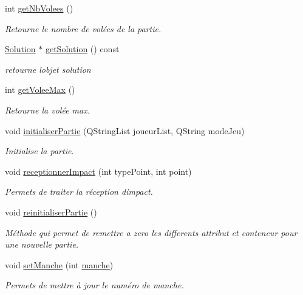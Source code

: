 \begin{DoxyCompactItemize}
int \hyperlink{class_darts_a4b93d786fbd25b9512ad08b67bca0a69}{get\+Nb\+Volees} ()
\begin{DoxyCompactList}\small\item\em Retourne le nombre de volées de la partie. \end{DoxyCompactList}\item 
\hyperlink{class_solution}{Solution} $\ast$ \hyperlink{class_darts_a2e41c247a12dfd3065c77c2484fc5532}{get\+Solution} () const
\begin{DoxyCompactList}\small\item\em retourne l\textquotesingle{}objet solution \end{DoxyCompactList}\item 
int \hyperlink{class_darts_af2ca14bafbcdabe87fc306cc2e1d390e}{get\+Volee\+Max} ()
\begin{DoxyCompactList}\small\item\em Retourne la volée max. \end{DoxyCompactList}\item 
void \hyperlink{class_darts_ac7000897b8d394c3be39804813a39dc8}{initialiser\+Partie} (Q\+String\+List joueur\+List, Q\+String mode\+Jeu)
\begin{DoxyCompactList}\small\item\em Initialise la partie. \end{DoxyCompactList}\item 
void \hyperlink{class_darts_a196bc4307c631310f641606012ab9e05}{receptionner\+Impact} (int type\+Point, int point)
\begin{DoxyCompactList}\small\item\em Permets de traiter la réception d\textquotesingle{}impact. \end{DoxyCompactList}\item 
void \hyperlink{class_darts_a70c68ed8bd56b63df203c25e6ed14f3b}{reinitialiser\+Partie} ()
\begin{DoxyCompactList}\small\item\em Méthode qui permet de remettre a zero les differents attribut et conteneur pour une nouvelle partie. \end{DoxyCompactList}\item 
void \hyperlink{class_darts_ab038eac80e5fc5e8abbab5682e87f8f2}{set\+Manche} (int \hyperlink{class_darts_ac7b7bd23e64b4fab3895f02f085ea85f}{manche})
\begin{DoxyCompactList}\small\item\em Permets de mettre à jour le numéro de manche. \end{DoxyCompactList}\item 

\end{DoxyCompactItemize}
